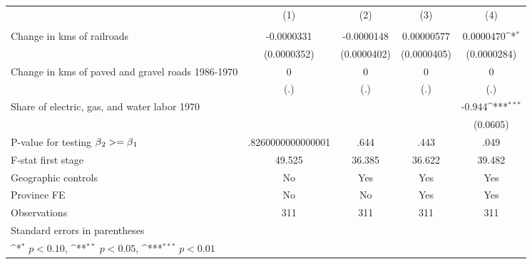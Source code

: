 {
\def\sym#1{\ifmmode^{#1}\else\(^{#1}\)\fi}
\begin{tabular}{l*{4}{c}}
\hline\hline
                &\multicolumn{1}{c}{(1)}&\multicolumn{1}{c}{(2)}&\multicolumn{1}{c}{(3)}&\multicolumn{1}{c}{(4)}\\
                &\multicolumn{1}{c}{}&\multicolumn{1}{c}{}&\multicolumn{1}{c}{}&\multicolumn{1}{c}{}\\
\hline
Change in kms of railroads&-0.0000331         &-0.0000148         &0.00000577         &0.0000470\sym{*}  \\
                &(0.0000352)         &(0.0000402)         &(0.0000405)         &(0.0000284)         \\
[1em]
Change in kms of paved and gravel roads 1986-1970&        0         &        0         &        0         &        0         \\
                &      (.)         &      (.)         &      (.)         &      (.)         \\
[1em]
Share of electric, gas, and water labor 1970&                  &                  &                  &   -0.944\sym{***}\\
                &                  &                  &                  & (0.0605)         \\
\hline
P-value for testing $\beta\\_2 >= \beta\\_1$&.8260000000000001         &     .644         &     .443         &     .049         \\
F-stat first stage&   49.525         &   36.385         &   36.622         &   39.482         \\
Geographic controls&       No         &      Yes         &      Yes         &      Yes         \\
Province FE     &       No         &       No         &      Yes         &      Yes         \\
Observations    &      311         &      311         &      311         &      311         \\
\hline\hline
\multicolumn{5}{l}{\footnotesize Standard errors in parentheses}\\
\multicolumn{5}{l}{\footnotesize \sym{*} \(p<0.10\), \sym{**} \(p<0.05\), \sym{***} \(p<0.01\)}\\
\end{tabular}
}
